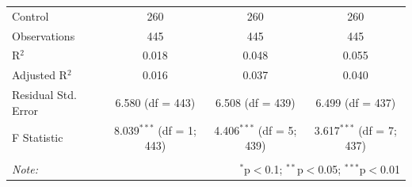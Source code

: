 \begin{table}[!htbp]
\begin{tabular}{@{\extracolsep{5pt}}lccc}
Control & 260 & 260 & 260 \\ 
Observations & 445 & 445 & 445 \\ 
R$^{2}$ & 0.018 & 0.048 & 0.055 \\ 
Adjusted R$^{2}$ & 0.016 & 0.037 & 0.040 \\ 
Residual Std. Error & 6.580 (df = 443) & 6.508 (df = 439) & 6.499 (df = 437) \\ 
F Statistic & 8.039$^{***}$ (df = 1; 443) & 4.406$^{***}$ (df = 5; 439) & 3.617$^{***}$ (df = 7; 437) \\ 
\hline 
\hline \\[-1.8ex] 
\textit{Note:}  & \multicolumn{3}{r}{$^{*}$p$<$0.1; $^{**}$p$<$0.05; $^{***}$p$<$0.01} \\ 
\end{tabular} 
\end{table} 
